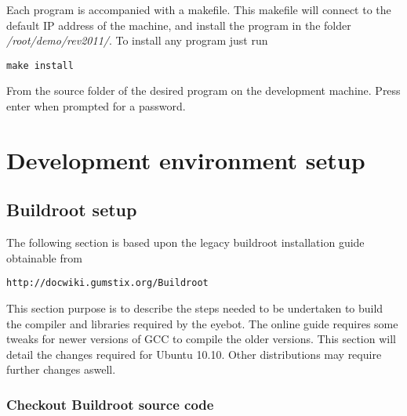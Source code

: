 Each program is accompanied with a makefile. This makefile will connect to the default IP address of the machine, and install the program in the folder \emph{/root/demo/rev2011/}. To install any program just run 

\begin{verbatim}
make install
\end{verbatim}

From the source folder of the desired program on the development machine. Press enter when prompted for a password.

\chapter{Development environment setup}

\section{Buildroot setup}

The following section is based upon the legacy buildroot installation guide obtainable from

\begin{verbatim}
http://docwiki.gumstix.org/Buildroot
\end{verbatim}

This section purpose is to describe the steps needed to be undertaken to build the compiler and libraries required by the eyebot. The online guide requires some tweaks for newer versions of GCC to compile the older versions. This section will detail the changes required for Ubuntu 10.10. Other distributions may require further changes aswell.

\subsection{Checkout Buildroot source code}

